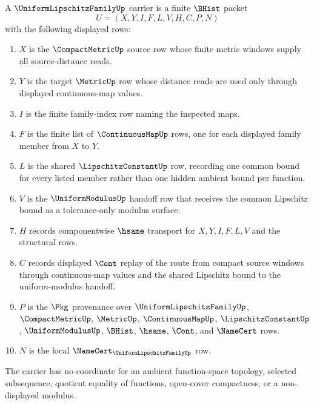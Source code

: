 \begin{definition}
\label{def:uniform-lipschitz-family-carrier}
A $\UniformLipschitzFamilyUp$ carrier is a finite $\BHist$ packet
$$
U=(X,Y,I,F,L,V,H,C,P,N)
$$
with the following displayed rows:
\begin{enumerate}
\item $X$ is the $\CompactMetricUp$ source row whose finite metric windows supply all source-distance reads.
\item $Y$ is the target $\MetricUp$ row whose distance reads are used only through displayed continuous-map values.
\item $I$ is the finite family-index row naming the inspected maps.
\item $F$ is the finite list of $\ContinuousMapUp$ rows, one for each displayed family member from $X$ to $Y$.
\item $L$ is the shared $\LipschitzConstantUp$ row, recording one common bound for every listed member rather than one hidden ambient bound per function.
\item $V$ is the $\UniformModulusUp$ handoff row that receives the common Lipschitz bound as a tolerance-only modulus surface.
\item $H$ records componentwise $\hsame$ transport for $X,Y,I,F,L,V$ and the structural rows.
\item $C$ records displayed $\Cont$ replay of the route from compact source windows through continuous-map values and the shared Lipschitz bound to the uniform-modulus handoff.
\item $P$ is the $\Pkg$ provenance over $\UniformLipschitzFamilyUp$, $\CompactMetricUp$, $\MetricUp$, $\ContinuousMapUp$, $\LipschitzConstantUp$, $\UniformModulusUp$, $\BHist$, $\hsame$, $\Cont$, and $\NameCert$ rows.
\item $N$ is the local $\NameCert_{\UniformLipschitzFamilyUp}$ row.
\end{enumerate}
The carrier has no coordinate for an ambient function-space topology, selected subsequence, quotient equality of functions, open-cover compactness, or a non-displayed modulus.
\end{definition}

